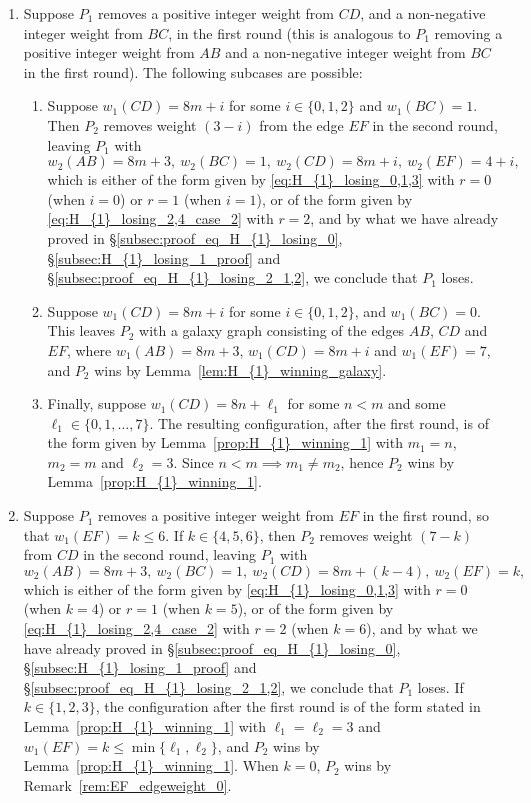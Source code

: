 \documentclass[11pt,reqno]{amsart}
\theoremstyle{definition}
\theoremstyle{definition}
\begin{document}
\begin{enumerate}
\item Suppose $P_{1}$ removes a positive integer weight from $CD$, and a non-negative integer weight from $BC$, in the first round (this is analogous to $P_{1}$ removing a positive integer weight from $AB$ and a non-negative integer weight from $BC$ in the first round). The following subcases are possible:
\begin{enumerate}
\item Suppose $w_{1}(CD)=8m+i$ for some $i \in \{0,1,2\}$ and $w_{1}(BC)=1$. Then $P_{2}$ removes weight $(3-i)$ from the edge $EF$ in the second round, leaving $P_{1}$ with
\begin{equation}
w_{2}(AB)=8m+3,\ w_{2}(BC)=1,\ w_{2}(CD)=8m+i,\ w_{2}(EF)=4+i,\nonumber
\end{equation}
which is either of the form given by \eqref{eq:H_{1}_losing_0,1,3} with $r=0$ (when $i=0$) or $r=1$ (when $i=1$), or of the form given by \eqref{eq:H_{1}_losing_2,4_case_2} with $r=2$, and by what we have already proved in \S\ref{subsec:proof_eq_H_{1}_losing_0}, \S\ref{subsec:H_{1}_losing_1_proof} and \S\ref{subsec:proof_eq_H_{1}_losing_2_1,2}, we conclude that $P_{1}$ loses.

\item Suppose $w_{1}(CD)=8m+i$ for some $i \in\{0,1,2\}$, and $w_{1}(BC)=0$. This leaves $P_{2}$ with a galaxy graph consisting of the edges $AB$, $CD$ and $EF$, where $w_{1}(AB)=8m+3$, $w_{1}(CD)=8m+i$ and $w_{1}(EF)=7$, and $P_{2}$ wins by Lemma~\ref{lem:H_{1}_winning_galaxy}.

\item Finally, suppose $w_{1}(CD)=8n+\ell_{1}$ for some $n < m$ and some $\ell_{1} \in \{0,1,\ldots,7\}$. The resulting configuration, after the first round, is of the form given by Lemma~\ref{prop:H_{1}_winning_1} with $m_{1}=n$, $m_{2}=m$ and $\ell_{2}=3$. Since $n<m \implies m_{1}\neq m_{2}$, hence $P_{2}$ wins by Lemma~\ref{prop:H_{1}_winning_1}. 
\end{enumerate}

\item Suppose $P_{1}$ removes a positive integer weight from $EF$ in the first round, so that $w_{1}(EF)=k \leqslant 6$. If $k\in \{4,5,6\}$, then $P_{2}$ removes weight $(7-k)$ from $CD$ in the second round, leaving $P_{1}$ with
\begin{equation}
w_{2}(AB)=8m+3,\ w_{2}(BC)=1,\ w_{2}(CD)=8m+(k-4),\ w_{2}(EF)=k,\nonumber
\end{equation}
which is either of the form given by \eqref{eq:H_{1}_losing_0,1,3} with $r=0$ (when $k=4$) or $r=1$ (when $k=5$), or of the form given by \eqref{eq:H_{1}_losing_2,4_case_2} with $r=2$ (when $k=6$), and by what we have already proved in \S\ref{subsec:proof_eq_H_{1}_losing_0}, \S\ref{subsec:H_{1}_losing_1_proof} and \S\ref{subsec:proof_eq_H_{1}_losing_2_1,2}, we conclude that $P_{1}$ loses. If $k\in\{1,2,3\}$, the configuration after the first round is of the form stated in Lemma~\ref{prop:H_{1}_winning_1} with $\ell_{1}=\ell_{2}=3$ and $w_{1}(EF)=k\leqslant \min\{\ell_{1},\ell_{2}\}$, and $P_{2}$ wins by Lemma~\ref{prop:H_{1}_winning_1}. When $k=0$, $P_{2}$ wins by Remark~\ref{rem:EF_edgeweight_0}. 


\end{enumerate}
\end{document}
